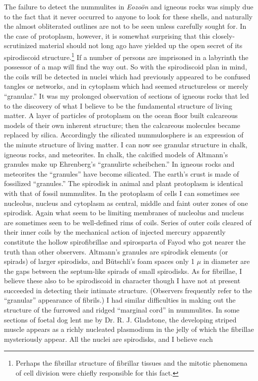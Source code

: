 \documentclass[a4paper, 12pt, oneside]{article}
\begin{document}
The failure to detect the nummulites in \emph{Eozoön} and igneous rocks was simply due to the fact that it never occurred to anyone to look for these shells, and naturally the almost obliterated outlines are not to be seen unless carefully sought for. In the case of protoplasm, however, it is somewhat surprising that this closely-scrutinized material should not long ago have yielded up the open secret of its spirodiscoid structure.\footnote{Perhaps the fibrillar structure of fibrillar tissues and the mitotic phenomena of cell division were chiefly responsible for this fact.} If a number of persons are imprisoned in a labyrinth the possessor of a map will find the way out. So with the spirodiscoid plan in mind, the coils will be detected in nuclei which had previously appeared to be confused tangles or networks, and in cytoplasm which had seemed structureless or merely ``granular.'' It was my prolonged observation of sections of igneous rocks that led to the discovery of what I believe to be the fundamental structure of living matter. A layer of particles of protoplasm on the ocean floor built calcareous models of their own inherent structure; then the calcareous molecules became replaced by silica. Accordingly the silicated nummulosphere is an expression of the minute structure of living matter. I can now see granular structure in chalk, igneous rocks, and meteorites. In chalk, the calcified models of Altmann's granules make up Ehrenberg's ``granulirte scheibchen.'' In igneous rocks and meteorites the ``granules'' have become silicated. The earth's crust is made of fossilized ``granules.'' The spirodisk in animal and plant protoplasm is identical with that of fossil nummulites. In the protoplasm of cells I can sometimes see nucleolus, nucleus and cytoplasm as central, middle and faint outer zones of one spirodisk. Again what seem to be limiting membranes of nucleolus and nucleus are sometimes seen to be well-defined rims of coils. Series of outer coils cleared of their inner coils by the mechanical action of injected mercury apparently constitute the hollow spirofibrillae and spirosparta of Fayod who got nearer the truth than other observers. Altmann's granules are spirodisk elements (or spirads) of larger spirodisks, and Bütschli's foam spaces only 1 $\mu$ in diameter are the gaps between the septum-like spirads of small spirodisks. As for fibrillae, I believe these also to be spirodiscoid in character though I have not at present succeeded in detecting their intimate structure. (Observers frequently refer to the ``granular'' appearance of fibrils.) I had similar difficulties in making out the structure of the furrowed and ridged ``marginal cord'' in nummulites. In some sections of foetal dog lent me by Dr. R. J. Gladstone, the developing striped muscle appears as a richly nucleated plasmodium in the jelly of which the fibrillae mysteriously appear. All the nuclei are spirodisks, and I believe each 
\end{document}
